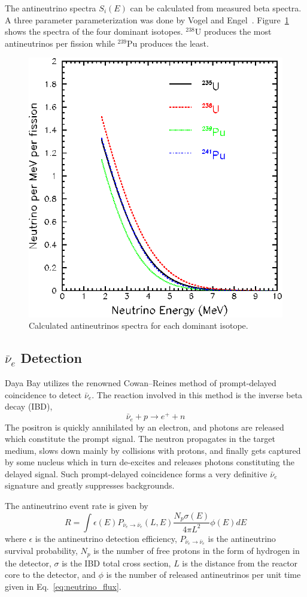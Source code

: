 The antineutrino spectra $S_i(E)$ can be calculated from measured beta spectra. A three parameter parameterization was done by Vogel and Engel~\cite{Vogel1989}. Figure~\ref{figure:isotope_antineutrino_spectra} shows the spectra of the four dominant isotopes. $^{238}$U produces the most antineutrinos per fission while $^{239}$Pu produces the least.
\begin{figure}
	\centering
	\includegraphics[width=.5\textwidth]{figures/chap2/isotope_antineutrino_spectra.eps}
	\caption{Calculated antineutrinos spectra for each dominant isotope.}
	\label{figure:isotope_antineutrino_spectra}
\end{figure}


\subsection{\texorpdfstring{$\bar{\nu}_e$}{Electron Antineutrino} Detection}
\label{sec:IBD}
Daya Bay utilizes the renowned Cowan–Reines method of prompt-delayed coincidence to detect $\bar{\nu}_e$. The reaction involved in this method is the inverse beta decay (IBD),
\begin{equation}
	\bar{\nu}_e+p\longrightarrow e^++n
\end{equation}
The positron is quickly annihilated by an electron, and photons are released which constitute the prompt signal. The neutron propagates in the target medium, slows down mainly by collisions with protons, and finally gets captured by some nucleus which in turn de-excites and releases photons constituting the delayed signal. Such prompt-delayed coincidence forms a very definitive $\bar{\nu}_e$ signature and greatly suppresses backgrounds.

The antineutrino event rate is given by
\begin{equation}
	R=\int \epsilon(E)P_{\bar{\nu}_e\rightarrow\bar{\nu}_e}(L,E)\frac{N_p\sigma(E)}{4\pi L^2}\phi(E)dE
\end{equation}
where $\epsilon$ is the antineutrino detection efficiency, $P_{\bar{\nu}_e\rightarrow\bar{\nu}_e}$ is the antineutrino survival probability, $N_p$ is the number of free protons in the form of hydrogen in the detector, $\sigma$ is the IBD total cross section, $L$ is the distance from the reactor core to the detector, and $\phi$ is the number of released antineutrinos per unit time given in Eq.~\ref{eq:neutrino_flux}.

